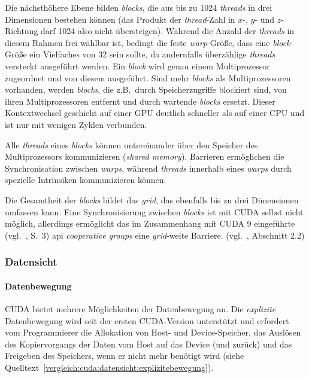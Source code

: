 Die nächsthöhere Ebene bilden \textit{blocks}, die aus bis zu \num{1024}
\textit{threads} in drei Dimensionen bestehen können (das Produkt der
\textit{thread}-Zahl in $x$-, $y$- und $z$-Richtung darf \num{1024} also nicht
übersteigen). Während die Anzahl der \textit{threads} in diesem Rahmen frei
wählbar ist, bedingt die feste \textit{warp}-Größe, dass eine
\textit{block}-Größe ein Vielfaches von 32 sein sollte, da andernfalls
überzählige \textit{threads} versteckt ausgeführt werden. Ein \textit{block}
wird genau einem Multiprozessor zugeordnet und von diesem ausgeführt. Sind mehr
\textit{blocks} als Multiprozessoren vorhanden, werden \textit{blocks}, die
z.B.\ durch Speicherzugriffe blockiert sind, von ihren Multiprozessoren entfernt
und durch wartende \textit{blocks} ersetzt. Dieser Kontextwechsel geschieht auf
einer GPU deutlich schneller als auf einer CPU und ist nur mit wenigen Zyklen
verbunden.

Alle \textit{threads} eines \textit{blocks} können untereinander über den
Speicher des Multiprozessors kommunizieren (\textit{shared memory}). Barrieren
ermöglichen die Synchronisation zwischen \textit{warps}, während
\textit{threads} innerhalb eines \textit{warps} durch spezielle Intrinsiken
kommunizieren können.

Die Gesamtheit der \textit{blocks} bildet das \textit{grid}, das ebenfalls bis
zu drei Dimensionen umfassen kann. Eine Synchronisierung zwischen
\textit{blocks} ist mit CUDA selbst nicht möglich, allerdings ermöglicht
das im Zusammenhang mit CUDA 9 eingeführte (vgl.~\cite{cuda2018}, S.\ 3)
\gls{api} \textit{cooperative groups} eine \textit{grid}-weite Barriere.
(vgl.~\cite{cudaguide}, Abschnitt 2.2)

\subsubsection{Datensicht}
\label{vergleich:cuda:datensicht}

\paragraph{Datenbewegung}

CUDA bietet mehrere Möglichkeiten der Datenbewegung an. Die \textit{explizite}
Datenbewegung wird seit der ersten CUDA-Version unterstützt und erfordert vom
Programmierer die Allokation von Host- und Device-Speicher, das Auslösen des
Kopiervorgangs der Daten vom Host auf das Device (und zurück) und das Freigeben
des Speichers, wenn er nicht mehr benötigt wird (siehe
Quelltext~\ref{vergleich:cuda:datensicht:explizitebewegung}).

